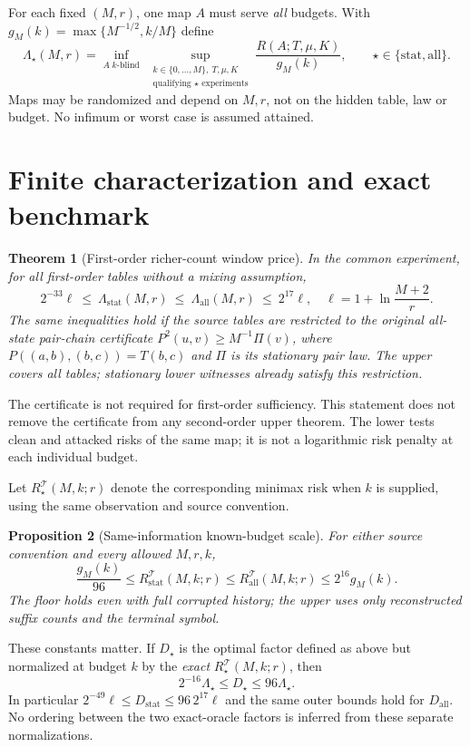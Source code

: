 \documentclass[10pt]{article}
\newtheorem{theorem}{Theorem}
\newtheorem{proposition}[theorem]{Proposition}
\newcommand{\stat}{\mathrm{stat}}
\newcommand{\all}{\mathrm{all}}
\begin{document}
For each fixed $(M,r)$, one map $A$ must serve \emph{all} budgets. With $g_M(k)=\max\{M^{-1/2},k/M\}$ define
\[
 \Lambda_\star(M,r)=\inf_{A\;k\text{-blind}}\ \sup_{\substack{k\in\{0,\ldots,M\},\ T,\mu,K\\\text{qualifying }\star\text{ experiments}}}
 \frac{R(A;T,\mu,K)}{g_M(k)},\qquad \star\in\{\stat,\all\}.
\]
Maps may be randomized and depend on $M,r$, not on the hidden table, law or budget. No infimum or worst case is assumed attained.
\newpage
\section{Finite characterization and exact benchmark}
\begin{theorem}[First-order richer-count window price]
In the common experiment, for all first-order tables without a mixing assumption,
\[
 \boxed{\quad 2^{-33}\ell\ \le\ \Lambda_\stat(M,r)\ \le\ \Lambda_\all(M,r)\ \le\ 2^{17}\ell,\quad
 \ell=1+\ln\frac{M+2}{r}.\quad}
\]
The same inequalities hold if the source tables are restricted to the original all-state pair-chain certificate $P^2(u,v)\ge M^{-1}\Pi(v)$, where $P((a,b),(b,c))=T(b,c)$ and $\Pi$ is its stationary pair law. The upper covers all tables; stationary lower witnesses already satisfy this restriction.
\end{theorem}
The certificate is not required for first-order sufficiency. This statement does not remove the certificate from any second-order upper theorem. The lower tests clean and attacked risks of the same map; it is not a logarithmic risk penalty at each individual budget.

Let $R_\star^{\mathcal T}(M,k;r)$ denote the corresponding minimax risk when $k$ is supplied, using the same observation and source convention.
\begin{proposition}[Same-information known-budget scale]
For either source convention and every allowed $M,r,k$,
\[
 \frac{g_M(k)}{96}\le R_\stat^{\mathcal T}(M,k;r)
 \le R_\all^{\mathcal T}(M,k;r)\le 2^{16}g_M(k).
\]
The floor holds even with full corrupted history; the upper uses only reconstructed suffix counts and the terminal symbol.
\end{proposition}
These constants matter. If $D_\star$ is the optimal factor defined as above but normalized at budget $k$ by the \emph{exact} $R_\star^{\mathcal T}(M,k;r)$, then
\[
 2^{-16}\Lambda_\star\le D_\star\le96\Lambda_\star.
\]
In particular $2^{-49}\ell\le D_\stat\le96\,2^{17}\ell$ and the same outer bounds hold for $D_\all$. No ordering between the two exact-oracle factors is inferred from these separate normalizations.
\end{document}

